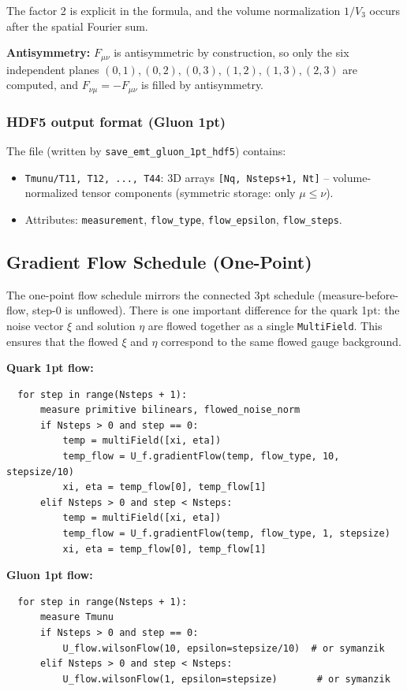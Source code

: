 \documentclass[11pt,a4paper]{article}
\newcommand{\code}[1]{\texttt{#1}}
\begin{document}
The factor 2 is explicit in the formula, and the volume normalization $1/V_3$ occurs after the spatial Fourier sum.

\textbf{Antisymmetry:} $F_{\mu\nu}$ is antisymmetric by construction, so only the six independent planes $(0,1), (0,2), (0,3), (1,2), (1,3), (2,3)$ are computed, and $F_{\nu\mu} = -F_{\mu\nu}$ is filled by antisymmetry.

\subsubsection{HDF5 output format (Gluon 1pt)}

The file (written by \code{save\_emt\_gluon\_1pt\_hdf5}) contains:

\begin{itemize}[nosep]
  \item \code{Tmunu/T11, T12, ..., T44}: 3D arrays \code{[Nq, Nsteps+1, Nt]} -- volume-normalized tensor components (symmetric storage: only $\mu \leq \nu$).
  \item Attributes: \code{measurement}, \code{flow\_type}, \code{flow\_epsilon}, \code{flow\_steps}.
\end{itemize}

\subsection{Gradient Flow Schedule (One-Point)}
\label{sec:flow_1pt}

The one-point flow schedule mirrors the connected 3pt schedule (measure-before-flow, step-0 is unflowed). There is one important difference for the quark 1pt: the noise vector $\xi$ and solution $\eta$ are flowed together as a single \code{MultiField}. This ensures that the flowed $\xi$ and $\eta$ correspond to the same flowed gauge background.

\textbf{Quark 1pt flow:}
\begin{verbatim}
  for step in range(Nsteps + 1):
      measure primitive bilinears, flowed_noise_norm
      if Nsteps > 0 and step == 0:
          temp = multiField([xi, eta])
          temp_flow = U_f.gradientFlow(temp, flow_type, 10, stepsize/10)
          xi, eta = temp_flow[0], temp_flow[1]
      elif Nsteps > 0 and step < Nsteps:
          temp = multiField([xi, eta])
          temp_flow = U_f.gradientFlow(temp, flow_type, 1, stepsize)
          xi, eta = temp_flow[0], temp_flow[1]
\end{verbatim}

\textbf{Gluon 1pt flow:}
\begin{verbatim}
  for step in range(Nsteps + 1):
      measure Tmunu
      if Nsteps > 0 and step == 0:
          U_flow.wilsonFlow(10, epsilon=stepsize/10)  # or symanzik
      elif Nsteps > 0 and step < Nsteps:
          U_flow.wilsonFlow(1, epsilon=stepsize)       # or symanzik
\end{verbatim}
\end{document}
